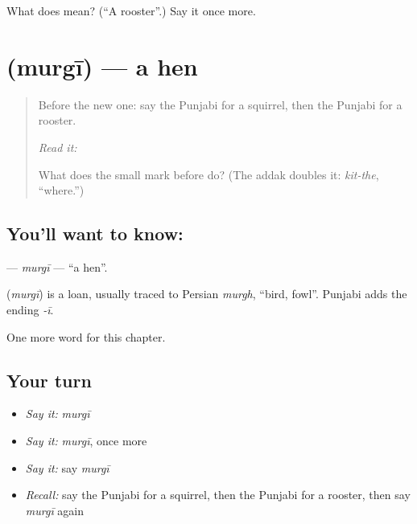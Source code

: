 \begin{tcolorbox}[breakable,colback=teal!4,colframe=teal!35!black,title={Before you move on}]
What does  mean? (\textquotedblleft{}A rooster\textquotedblright{}.) Say it once more.
\end{tcolorbox}
\section[\texorpdfstring{\pa{ਮੁਰਗੀ} (murgī)}{ਮੁਰਗੀ (murgī)}]{ (murgī) — a hen}

\label{lesson:PA-C133-murgi}



\begin{quote}
Before the new one: say the Punjabi for a squirrel, then the Punjabi for a rooster.

\emph{Read it:} \textbf{}

What does the small mark before \textbf{} do? (The addak doubles it: \emph{kit-the}, \textquotedblleft{}where.\textquotedblright{})
\end{quote}

\subsection*{You'll want to know: }
\textbf{} — \emph{murgī} — \textquotedblleft{}a hen\textquotedblright{}.

\begin{cousinweb}
\textbf{} (\emph{murgī}) is a loan, usually traced to Persian \emph{murgh}, \textquotedblleft{}bird, fowl\textquotedblright{}. Punjabi adds the ending \emph{-ī}.
\end{cousinweb}

\begin{grammarlens}[title={What you've built}]
One more word for this chapter.
\end{grammarlens}

\subsection*{Your turn}
\begin{itemize}
\raggedright
  \item \emph{Say it:} \emph{murgī}
  \item \emph{Say it:} \emph{murgī}, once more
  \item \emph{Say it:} say \emph{murgī}
  \item \emph{Recall:} say the Punjabi for a squirrel, then the Punjabi for a rooster, then say \emph{murgī} again
\end{itemize}

